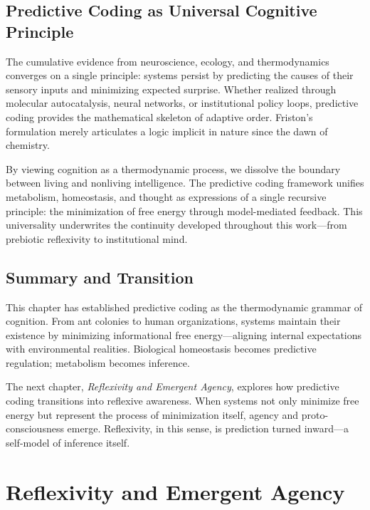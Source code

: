 \documentclass[11pt,a4paper]{article}
\begin{document}
\subsection{Predictive Coding as Universal Cognitive Principle}

The cumulative evidence from neuroscience, ecology, and thermodynamics converges on a single principle: systems persist by predicting the causes of their sensory inputs and minimizing expected surprise.  Whether realized through molecular autocatalysis, neural networks, or institutional policy loops, predictive coding provides the mathematical skeleton of adaptive order.  Friston’s formulation merely articulates a logic implicit in nature since the dawn of chemistry.

By viewing cognition as a thermodynamic process, we dissolve the boundary between living and nonliving intelligence.  The predictive coding framework unifies metabolism, homeostasis, and thought as expressions of a single recursive principle: the minimization of free energy through model-mediated feedback.  This universality underwrites the continuity developed throughout this work—from prebiotic reflexivity to institutional mind.

\subsection{Summary and Transition}

This chapter has established predictive coding as the thermodynamic grammar of cognition.  From ant colonies to human organizations, systems maintain their existence by minimizing informational free energy—aligning internal expectations with environmental realities.  Biological homeostasis becomes predictive regulation; metabolism becomes inference.  

The next chapter, \textit{Reflexivity and Emergent Agency}, explores how predictive coding transitions into reflexive awareness.  When systems not only minimize free energy but represent the process of minimization itself, agency and proto-consciousness emerge.  Reflexivity, in this sense, is prediction turned inward—a self-model of inference itself.


\section{Reflexivity and Emergent Agency}
\label{sec:reflexivity}
\end{document}
